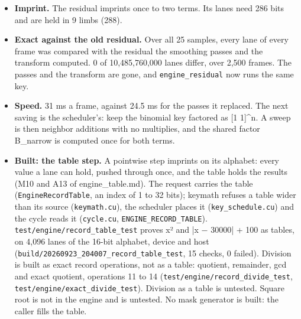 \begin{itemize}
\item \textbf{Imprint.} The residual imprints once to two terms. Its lanes need 286 bits and are held in 9 limbs (288).
\item \textbf{Exact against the old residual.} Over all 25 samples, every lane of every frame was compared with the residual the smoothing passes and the transform computed. 0 of 10,485,760,000 lanes differ, over 2,500 frames. The passes and the transform are gone, and \texttt{engine\_\allowbreak{}residual} now runs the same key.
\item \textbf{Speed.} 31 ms a frame, against 24.5 ms for the passes it replaced. The next saving is the scheduler's: keep the binomial key factored as [1 1]\textasciicircum{}n. A sweep is then neighbor additions with no multiplies, and the shared factor B\_\allowbreak{}narrow is computed once for both terms.
\item \textbf{Built: the table step.} A pointwise step imprints on its alphabet: every value a lane can hold, pushed through once, and the table holds the results (M10 and A13 of engine\_\allowbreak{}table.md). The request carries the table (\texttt{EngineRecordTable}, an index of 1 to 32 bits); keymath refuses a table wider than its source (\texttt{keymath.\allowbreak{}cu}), the scheduler places it (\texttt{key\_\allowbreak{}schedule.\allowbreak{}cu}) and the cycle reads it (\texttt{cycle.\allowbreak{}cu}, \texttt{ENGINE\_\allowbreak{}RECORD\_\allowbreak{}TABLE}). \texttt{test/\allowbreak{}engine/\allowbreak{}record\_\allowbreak{}table\_\allowbreak{}test} proves x² and |x − 30000| + 100 as tables, on 4,096 lanes of the 16-bit alphabet, device and host (\texttt{build/\allowbreak{}20260923\_\allowbreak{}204007\_\allowbreak{}record\_\allowbreak{}table\_\allowbreak{}test}, 15 checks, 0 failed). Division is built as exact record operations, not as a table: quotient, remainder, gcd and exact quotient, operations 11 to 14 (\texttt{test/\allowbreak{}engine/\allowbreak{}record\_\allowbreak{}divide\_\allowbreak{}test}, \texttt{test/\allowbreak{}engine/\allowbreak{}exact\_\allowbreak{}divide\_\allowbreak{}test}). Division as a table is untested. Square root is not in the engine and is untested. No mask generator is built: the caller fills the table.
\end{itemize}

